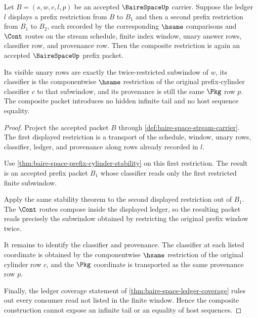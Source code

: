 \begin{theorem}
\label{thm:baire-space-prefix-restriction-composition}
Let $B=(s,w,c,l,p)$ be an accepted $\BaireSpaceUp$ carrier. Suppose the ledger
$l$ displays a prefix restriction from $B$ to $B_1$ and then a second prefix
restriction from $B_1$ to $B_2$, each recorded by the corresponding $\hsame$
comparisons and $\Cont$ routes on the stream schedule, finite index window,
unary answer rows, classifier row, and provenance row. Then the composite
restriction is again an accepted $\BaireSpaceUp$ prefix packet.

Its visible unary rows are exactly the twice-restricted subwindow of $w$, its
classifier is the componentwise $\hsame$ restriction of the original
prefix-cylinder classifier $c$ to that subwindow, and its provenance is still
the same $\Pkg$ row $p$. The composite packet introduces no hidden infinite
tail and no host sequence equality.
\end{theorem}
\begin{proof}
Project the accepted packet $B$ through
\autoref{def:baire-space-stream-carrier}. The first displayed restriction is a
transport of the schedule, window, unary rows, classifier, ledger, and
provenance along rows already recorded in $l$.

Use \autoref{thm:baire-space-prefix-cylinder-stability} on this first
restriction. The result is an accepted prefix packet $B_1$ whose classifier
reads only the first restricted finite subwindow.

Apply the same stability theorem to the second displayed restriction out of
$B_1$. The $\Cont$ routes compose inside the displayed ledger, so the resulting
packet reads precisely the subwindow obtained by restricting the original
prefix window twice.

It remains to identify the classifier and provenance. The classifier at each
listed coordinate is obtained by the componentwise $\hsame$ restriction of the
original cylinder row $c$, and the $\Pkg$ coordinate is transported as the same
provenance row $p$.

Finally, the ledger coverage statement of
\autoref{thm:baire-space-ledger-coverage} rules out every consumer read not
listed in the finite window. Hence the composite construction cannot expose an
infinite tail or an equality of host sequences.
\end{proof}

